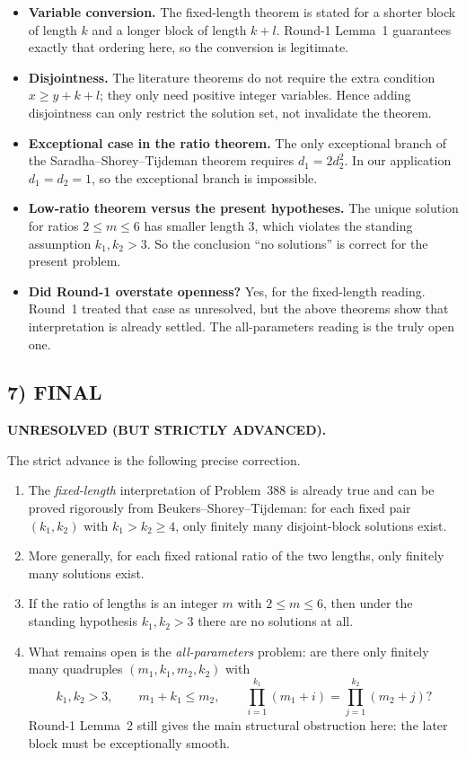 \begin{itemize}
\item \textbf{Variable conversion.}
The fixed-length theorem is stated for a shorter block of length $k$ and a longer block of length $k+l$.
Round-1 Lemma~1 guarantees exactly that ordering here, so the conversion is legitimate.

\item \textbf{Disjointness.}
The literature theorems do not require the extra condition $x\ge y+k+l$; they only need positive integer variables.
Hence adding disjointness can only restrict the solution set, not invalidate the theorem.

\item \textbf{Exceptional case in the ratio theorem.}
The only exceptional branch of the Saradha--Shorey--Tijdeman theorem requires $d_1=2d_2^2$.
In our application $d_1=d_2=1$, so the exceptional branch is impossible.

\item \textbf{Low-ratio theorem versus the present hypotheses.}
The unique solution for ratios $2\le m\le 6$ has smaller length $3$, which violates the standing assumption $k_1,k_2>3$.
So the conclusion ``no solutions'' is correct for the present problem.

\item \textbf{Did Round-1 overstate openness?}
Yes, for the fixed-length reading.
Round~1 treated that case as unresolved, but the above theorems show that interpretation is already settled.
The all-parameters reading is the truly open one.
\end{itemize}

\subsection*{7) FINAL}

\textbf{UNRESOLVED (BUT STRICTLY ADVANCED).}

The strict advance is the following precise correction.

\begin{enumerate}
\item The \emph{fixed-length} interpretation of Problem~388 is already true and can be proved rigorously from Beukers--Shorey--Tijdeman: for each fixed pair $(k_1,k_2)$ with $k_1>k_2\ge 4$, only finitely many disjoint-block solutions exist.

\item More generally, for each fixed rational ratio of the two lengths, only finitely many solutions exist.

\item If the ratio of lengths is an integer $m$ with $2\le m\le 6$, then under the standing hypothesis $k_1,k_2>3$ there are no solutions at all.

\item What remains open is the \emph{all-parameters} problem: are there only finitely many quadruples $(m_1,k_1,m_2,k_2)$ with
\[
k_1,k_2>3,\qquad m_1+k_1\le m_2,\qquad
\prod_{i=1}^{k_1}(m_1+i)=\prod_{j=1}^{k_2}(m_2+j)?
\]
Round-1 Lemma~2 still gives the main structural obstruction here: the later block must be exceptionally smooth.
\end{enumerate}

